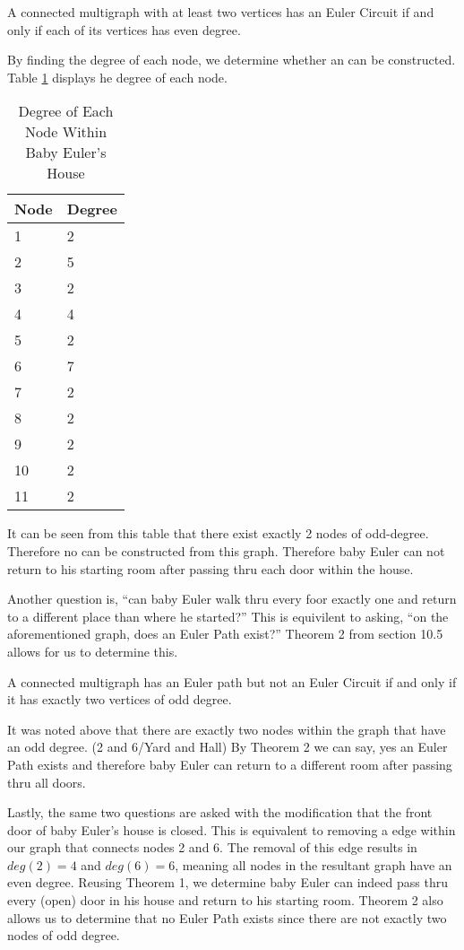 \begin{theo}
A connected multigraph with at least two vertices has an Euler Circuit if and only if each of
its vertices has even degree.
\end{theo}

By finding the degree of each node, we determine whether an \EC can be constructed. Table \ref{tab:Graph1Deg} displays he degree of each node.

\newpage

\begin{table}[ht]
\begin{center}
\begin{tabular}{l|l}
Node & Degree \\
\hline
1 & 2 \\
2 & 5 \\
3 & 2 \\
4 & 4 \\
5 & 2 \\
6 & 7 \\
7 & 2 \\
8 & 2 \\
9 & 2 \\
10 & 2 \\
11 & 2 \\
\end{tabular}
\end{center}
\caption{Degree of Each Node Within Baby Euler's House}
\label{tab:Graph1Deg}
\end{table}

It can be seen from this table that there exist exactly 2 nodes of odd-degree. Therefore no \EC can be constructed from this graph. Therefore baby Euler can not return to his starting room after passing thru each door within the house.

Another question is, ``can baby Euler walk thru every foor exactly one and return to a different place than where he started?'' This is equivilent to asking, ``on the aforementioned graph, does an Euler Path exist?'' Theorem 2 from section 10.5 allows for us to determine this.

\begin{theo}
A connected multigraph has an Euler path but not an Euler Circuit if and only if it has exactly
two vertices of odd degree.
\end{theo}

It was noted above that there are exactly two nodes within the graph that have an odd degree. (2 and 6/Yard and Hall) By Theorem 2 we can say, yes an Euler Path exists and therefore baby Euler can return to a different room after passing thru all doors.

Lastly, the same two questions are asked with the modification that the front door of baby Euler's house is closed. This is equivalent to removing a edge within our graph that connects nodes 2 and 6. The removal of this edge results in $deg(2)=4$ and $deg(6)=6$, meaning all nodes in the resultant graph have an even degree. Reusing Theorem 1, we determine baby Euler can indeed pass thru every (open) door in his house and return to his starting room. Theorem 2 also allows us to determine that no Euler Path exists since there are not exactly two nodes of odd degree.